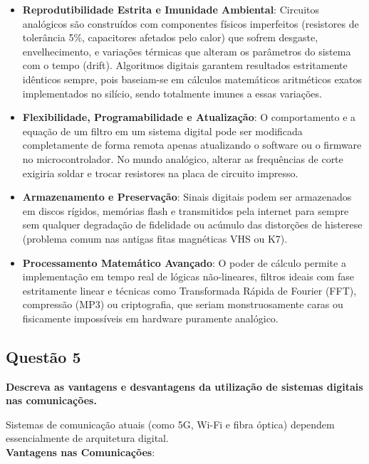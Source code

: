 \begin{itemize}
\tightlist
\item
  \textbf{Reprodutibilidade Estrita e Imunidade Ambiental}: Circuitos analógicos são construídos com componentes físicos imperfeitos (resistores de tolerância 5\%, capacitores afetados pelo calor) que sofrem desgaste, envelhecimento, e variações térmicas que alteram os parâmetros do sistema com o tempo (drift). Algoritmos digitais garantem resultados estritamente idênticos sempre, pois baseiam-se em cálculos matemáticos aritméticos exatos implementados no silício, sendo totalmente imunes a essas variações.
\item
  \textbf{Flexibilidade, Programabilidade e Atualização}: O comportamento e a equação de um filtro em um sistema digital pode ser modificada completamente de forma remota apenas atualizando o software ou o firmware no microcontrolador. No mundo analógico, alterar as frequências de corte exigiria soldar e trocar resistores na placa de circuito impresso.
\item
  \textbf{Armazenamento e Preservação}: Sinais digitais podem ser armazenados em discos rígidos, memórias flash e transmitidos pela internet para sempre sem qualquer degradação de fidelidade ou acúmulo das distorções de histerese (problema comum nas antigas fitas magnéticas VHS ou K7).
\item
  \textbf{Processamento Matemático Avançado}: O poder de cálculo permite a implementação em tempo real de lógicas não-lineares, filtros ideais com fase estritamente linear e técnicas como Transformada Rápida de Fourier (FFT), compressão (MP3) ou criptografia, que seriam monstruosamente caras ou fisicamente impossíveis em hardware puramente analógico.
\end{itemize}

\subsection{Questão 5}\label{questuxe3o-5}

\textbf{Descreva as vantagens e desvantagens da utilização de sistemas digitais nas comunicações.}

Sistemas de comunicação atuais (como 5G, Wi-Fi e fibra óptica) dependem essencialmente de arquitetura digital.\\
\textbf{Vantagens nas Comunicações}:

